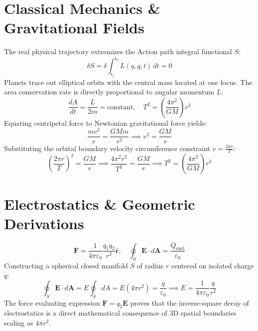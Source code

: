 \documentclass[11pt,a4paper]{article}
\begin{document}
\section{Classical Mechanics \& Gravitational Fields}
The real physical trajectory extremizes the Action path integral functional $S$:
\begin{equation}
    \delta S = \delta \int_{t_1}^{t_2} L(q, \dot{q}, t) \, dt = 0
\end{equation}
Planets trace out elliptical orbits with the central mass located at one focus. The area conservation rate is directly proportional to angular momentum $L$:
\begin{equation}
    \frac{dA}{dt} = \frac{L}{2m} = \text{constant}, \quad T^2 = \left(\frac{4\pi^2}{GM}\right)r^3
\end{equation}
Equating centripetal force to Newtonian gravitational force yields:
\begin{equation}
    \frac{mv^2}{r} = \frac{GMm}{r^2} \implies v^2 = \frac{GM}{r}
\end{equation}
Substituting the orbital boundary velocity circumference constraint $v = \frac{2\pi r}{T}$:
\begin{equation}
    \left(\frac{2\pi r}{T}\right)^2 = \frac{GM}{r} \implies \frac{4\pi^2 r^2}{T^2} = \frac{GM}{r} \implies T^2 = \left(\frac{4\pi^2}{GM}\right)r^3
\end{equation}

\section{Electrostatics \& Geometric Derivations}
\begin{equation}
    \mathbf{F} = \frac{1}{4\pi\varepsilon_0}\frac{q_1 q_2}{r^2}\mathbf{\hat{r}}, \quad \oint_S \mathbf{E} \cdot d\mathbf{A} = \frac{Q_{\text{encl}}}{\varepsilon_0}
\end{equation}
Constructing a spherical closed manifold $S$ of radius $r$ centered on isolated charge $q$:
\begin{equation}
    \oint_S \mathbf{E} \cdot d\mathbf{A} = E \oint_S dA = E(4\pi r^2) = \frac{q}{\varepsilon_0} \implies E = \frac{1}{4\pi\varepsilon_0}\frac{q}{r^2}
\end{equation}
The force evaluating expression $\mathbf{F} = q_2\mathbf{E}$ proves that the inverse-square decay of electrostatics is a direct mathematical consequence of 3D spatial boundaries scaling as $4\pi r^2$.
\end{document}
